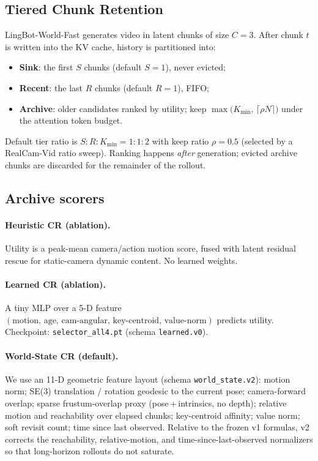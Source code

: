 \documentclass{article}
\begin{document}
\subsection{Tiered Chunk Retention}
LingBot-World-Fast generates video in latent chunks of size $C{=}3$.  After
chunk $t$ is written into the KV cache, history is partitioned into:
\begin{itemize}
  \item \textbf{Sink}: the first $S$ chunks (default $S{=}1$), never evicted;
  \item \textbf{Recent}: the last $R$ chunks (default $R{=}1$), FIFO;
  \item \textbf{Archive}: older candidates ranked by utility; keep
        $\max\!\big(K_{\min},\,\lceil \rho N\rceil\big)$ under the attention
        token budget.
\end{itemize}
Default tier ratio is $S{:}R{:}K_{\min}=1{:}1{:}2$ with keep ratio
$\rho{=}0.5$ (selected by a RealCam-Vid ratio sweep).  Ranking happens
\emph{after} generation; evicted archive chunks are discarded for the
remainder of the rollout.

\subsection{Archive scorers}
\paragraph{Heuristic CR (ablation).}
Utility is a peak-mean camera/action motion score, fused with latent
residual rescue for static-camera dynamic content.  No learned weights.

\paragraph{Learned CR (ablation).}
A tiny MLP over a 5-D feature
$(\mathrm{motion},\,\mathrm{age},\,\mathrm{cam\text{-}angular},\,
\mathrm{key\text{-}centroid},\,\mathrm{value\text{-}norm})$ predicts
utility.  Checkpoint: \texttt{selector\_all4.pt} (schema
\texttt{learned.v0}).

\paragraph{World-State CR (default).}
\label{sec:ws-cr}
We use an 11-D geometric feature layout (schema \texttt{world\_state.v2}):
motion norm; SE(3) translation / rotation geodesic to the current pose;
camera-forward overlap; sparse frustum-overlap proxy (pose\,+\,intrinsics,
no depth); relative motion and reachability over elapsed chunks;
key-centroid affinity; value norm; soft revisit count; time since last
observed.  Relative to the frozen v1 formulas, v2 corrects the
reachability, relative-motion, and time-since-last-observed normalizers
so that long-horizon rollouts do not saturate.
\end{document}
